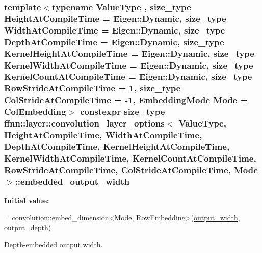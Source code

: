 \hypertarget{structffnn_1_1layer_1_1convolution__layer__options_a9c1afe561f9ecbd8f212e260b3fbcd9e}{
\subsubsection[{embedded\-\_\-output\-\_\-width}]{\setlength{\rightskip}{0pt plus 5cm}template$<$typename Value\-Type , size\-\_\-type Height\-At\-Compile\-Time = Eigen\-::\-Dynamic, size\-\_\-type Width\-At\-Compile\-Time = Eigen\-::\-Dynamic, size\-\_\-type Depth\-At\-Compile\-Time = Eigen\-::\-Dynamic, size\-\_\-type Kernel\-Height\-At\-Compile\-Time = Eigen\-::\-Dynamic, size\-\_\-type Kernel\-Width\-At\-Compile\-Time = Eigen\-::\-Dynamic, size\-\_\-type Kernel\-Count\-At\-Compile\-Time = Eigen\-::\-Dynamic, size\-\_\-type Row\-Stride\-At\-Compile\-Time = 1, size\-\_\-type Col\-Stride\-At\-Compile\-Time = -\/1, Embedding\-Mode Mode = Col\-Embedding$>$ constexpr {\bf size\-\_\-type} {\bf ffnn\-::layer\-::convolution\-\_\-layer\-\_\-options}$<$ Value\-Type, Height\-At\-Compile\-Time, Width\-At\-Compile\-Time, Depth\-At\-Compile\-Time, Kernel\-Height\-At\-Compile\-Time, Kernel\-Width\-At\-Compile\-Time, Kernel\-Count\-At\-Compile\-Time, Row\-Stride\-At\-Compile\-Time, Col\-Stride\-At\-Compile\-Time, Mode $>$\-::embedded\-\_\-output\-\_\-width\hspace{0.3cm}{\ttfamily [static]}}}\label{structffnn_1_1layer_1_1convolution__layer__options_a9c1afe561f9ecbd8f212e260b3fbcd9e}
{\bfseries Initial value\-:}
\begin{DoxyCode}
=
    convolution::embed\_dimension<Mode, RowEmbedding>(\hyperlink{structffnn_1_1layer_1_1convolution__layer__options_a3d9d4fcab54f0e960fe1e860fa2ee76e}{output\_width},  
      \hyperlink{structffnn_1_1layer_1_1convolution__layer__options_a5f03a7c3b15a4baf82477c5a095e5ace}{output\_depth})
\end{DoxyCode}


Depth-\/embedded output width. 


